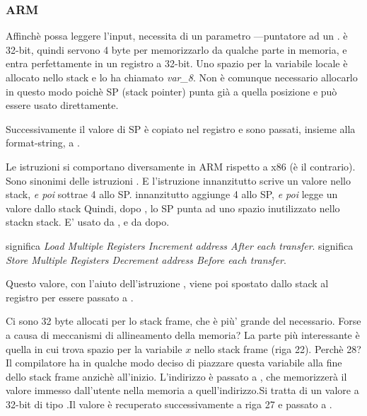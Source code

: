 \subsubsection{ARM}

\myparagraph{\OptimizingKeilVI (\ThumbMode)}



\myindex{\CLanguageElements!\Pointers}

Affinchè \scanf possa leggere l'input, necessita di un parametro ---puntatore ad un \Tint.
\Tint è 32-bit, quindi servono 4 byte per memorizzarlo da qualche parte in memoria, e entra perfettamente in un registro a 32-bit.
Uno spazio per la variabile locale  è allocato nello stack e \IDA
lo ha chiamato \emph{var\_8}. Non è comunque necessario allocarlo in questo modo poichè \ac{SP} (\gls{stack pointer}) punta già a quella posizione e può essere usato direttamente.

Successivamente il valore di \ac{SP} è copiato nel registro  e sono passati, insieme alla format-string, a \scanf.

Le istruzioni  si comportano diversamente in ARM rispetto a x86 (è il contrario). Sono sinonimi delle istruzioni .
E l'istruzione  innanzitutto scrive un valore nello stack, \emph{e poi} sottrae 4 allo \ac{SP}.
 innanzitutto aggiunge 4 allo \ac{SP}, \emph{e poi} legge un valore dallo stack
Quindi, dopo , lo \ac{SP} punta ad uno spazio inutilizzato nello stackn stack.
E' usato da \scanf, e da \printf dopo.

 significa \emph{Load Multiple Registers Increment address After each transfer}.
 significa \emph{Store Multiple Registers Decrement address Before each transfer}.

Questo valore, con l'aiuto dell'istruzione  , viene poi spostato dallo stack al registro  per essere passato a \printf.




Ci sono 32 byte allocati per lo stack frame, che è più' grande del necessario. Forse a causa di meccanismi di allineamento della memoria?
La parte più interessante è quella in cui trova spazio per la variabile $x$ nello stack frame (riga 22).
Perchè 28? Il compilatore ha in qualche modo deciso di piazzare questa variabile alla fine dello stack frame anzichè all'inizio.
L'indirizzo è passato a \scanf, che memorizzerà il valore immesso dall'utente nella memoria a quell'indirizzo.Si tratta di un valore a 32-bit di tipo \Tint.Il valore è recuperato successivamente a riga 27 e passato a \printf.

